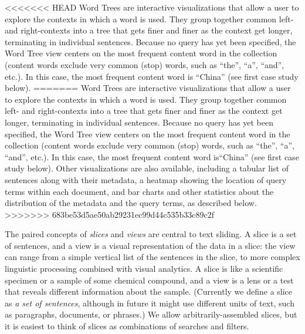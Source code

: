 \documentclass{sig-alternate}
\begin{document}
<<<<<<< HEAD
Word Trees \cite{wattenberg_word_2008} are interactive visualizations that allow a user to explore the contexts in which a word is used. They group together common left- and right-contexts into a tree that gets finer and finer as the context get longer, terminating in individual sentences.  Because no query has yet been specified, the Word Tree view centers on the most frequent content word in the collection (content words exclude very common (stop) words, such as ``the'', ``a'', ``and'', etc.). In this case, the most frequent content word is ``China'' (see first case study below).
=======
Word Trees \cite{wattenberg_word_2008} are interactive visualizations that allow a user to explore the contexts in which a word is used. They group together common left- and right-contexts into a tree that gets finer and finer as the context get longer, terminating in individual sentences.  Because no query has yet been specified, the Word Tree view centers on the most frequent content word in the collection (content words exclude very common (stop) words, such as ``the'', ``a'', ``and'', etc.). In this case, the most frequent content word is``China'' (see first case study below).  Other visualizations are also available, including a tabular list of sentences along with their metadata, a heatmap showing the location of query terms within each document, and bar charts and other statistics about the distribution of the metadata and the query terms, as described below.
>>>>>>> 683be53d5ae50ab29231ec99d44c535b33c89c2f

The paired concepts of \emph{slices} and \emph{views} are central to text sliding. A slice is a set of sentences, and a view is a visual representation of the data in a slice: the view can range from a simple vertical list of the sentences in the slice, to more complex linguistic processing combined with visual analytics.  A slice is like a scientific specimen or a sample of some chemical compound,  and a view is a lens or a test that reveals different information about the sample.
(Currently we define a slice as \emph{a set of sentences}, although in future it might use different units of text, such as paragraphs, documents, or phrases.) We allow arbitrarily-assembled slices, but it is easiest to think of slices as combinations of searches and filters.  
\end{document}
